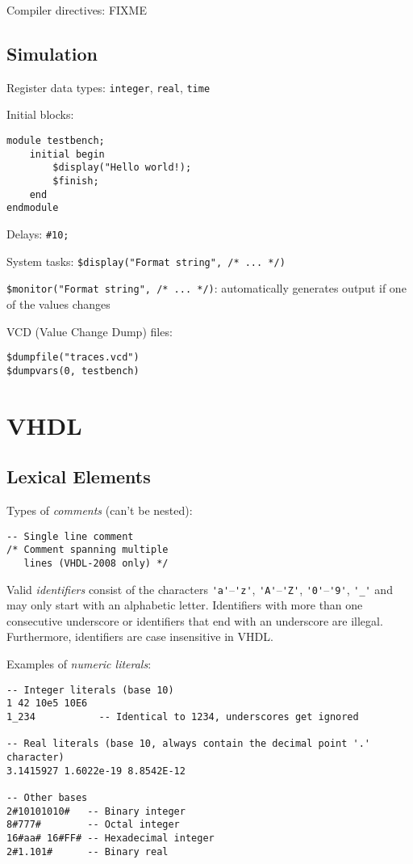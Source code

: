 \documentclass[fontsize=11pt,a4paper]{scrartcl}
\begin{document}
Compiler directives: FIXME
%
%
%
%
\subsection{Simulation}
Register data types: \lstinline!integer!, \lstinline!real!, \lstinline!time!

Initial blocks:
\begin{lstlisting}
module testbench;
	initial begin
		$display("Hello world!);
		$finish;
	end
endmodule
\end{lstlisting}

Delays: \lstinline!#10;!

System tasks: \lstinline!$display("Format string", /* ... */)!

\lstinline!$monitor("Format string", /* ... */)!: automatically generates output if one of the values changes

VCD (Value Change Dump) files:
\begin{lstlisting}
$dumpfile("traces.vcd")
$dumpvars(0, testbench)
\end{lstlisting}
%
%
%
%
%
\section{VHDL}
\subsection{Lexical Elements}
Types of \emph{comments} (can't be nested):
\begin{lstlisting}
-- Single line comment
/* Comment spanning multiple
   lines (VHDL-2008 only) */
\end{lstlisting}

Valid \emph{identifiers} consist of the characters \lstinline!'a'!--\lstinline!'z'!, \lstinline!'A'!--\lstinline!'Z'!, \lstinline!'0'!--\lstinline!'9'!, \lstinline!'_'! and may only start with an alphabetic letter. Identifiers with more than one consecutive underscore or identifiers that end with an underscore are illegal. Furthermore, identifiers are case insensitive in VHDL.

Examples of \emph{numeric literals}:
\begin{lstlisting}
-- Integer literals (base 10)
1 42 10e5 10E6
1_234           -- Identical to 1234, underscores get ignored

-- Real literals (base 10, always contain the decimal point '.' character)
3.1415927 1.6022e-19 8.8542E-12

-- Other bases
2#10101010#   -- Binary integer
8#777#        -- Octal integer
16#aa# 16#FF# -- Hexadecimal integer
2#1.101#      -- Binary real
\end{lstlisting}
\end{document}
